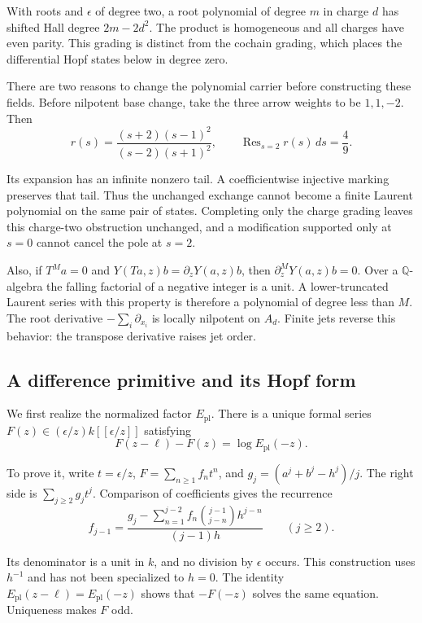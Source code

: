 With roots and $\epsilon$ of degree two, a root polynomial
of degree $m$ in charge $d$ has shifted Hall degree
$2m-2d^2$. The product is homogeneous and all charges have
even parity. This grading is distinct from the cochain
grading, which places the differential Hopf states below
in degree zero.

There are two reasons to change the polynomial carrier before
constructing these fields. Before nilpotent base change, take
the three arrow weights to be $1,1,-2$. Then
\[
 r(s)=\frac{(s+2)(s-1)^2}{(s-2)(s+1)^2},
 \qquad\operatorname{Res}_{s=2}r(s)\,ds=\frac49 .
\]

Its expansion has an infinite nonzero tail.
A coefficientwise injective marking preserves that tail.
Thus the unchanged exchange cannot become a finite Laurent
polynomial on the same pair of states. Completing only the charge grading leaves this
charge-two obstruction unchanged, and a modification supported
only at $s=0$ cannot cancel the pole at $s=2$.

Also, if $T^Ma=0$ and
$Y(Ta,z)b=\partial_zY(a,z)b$, then
$\partial_z^MY(a,z)b=0$.
Over a $\mathbb Q$-algebra the falling factorial of a
negative integer is a unit.
A lower-truncated Laurent series with this property is
therefore a polynomial of degree less than $M$.
The root derivative $-\sum_i\partial_{x_i}$ is locally
nilpotent on $A_d$. Finite jets reverse this behavior:
the transpose derivative raises jet order.

\subsection{A difference primitive and its Hopf form}

We first realize the normalized factor $E_{\mathrm{pl}}$.
There is a unique formal series
$F(z)\in(\epsilon/z)k[[\epsilon/z]]$ satisfying
\begin{equation}\label{v4-arith:curve:eq:difference-primitive}
 F(z-\ell)-F(z)=\log E_{\mathrm{pl}}(-z).
\end{equation}

To prove it, write $t=\epsilon/z$, $F=\sum_{n\geq1}f_nt^n$,
and
$g_j=(a^j+b^j-h^j)/j$.
The right side is $\sum_{j\geq2}g_jt^j$. Comparison of
coefficients gives the recurrence
\[
 f_{j-1}=
 \frac{g_j-\sum_{n=1}^{j-2}
                f_n\binom{j-1}{j-n}h^{j-n}}
      {(j-1)h}\qquad(j\geq2).
\]

Its denominator is a unit in $k$, and no division by
$\epsilon$ occurs. This construction uses $h^{-1}$ and
has not been specialized to $h=0$.
The identity
$E_{\mathrm{pl}}(z-\ell)=E_{\mathrm{pl}}(-z)$ shows that
$-F(-z)$ solves the same equation. Uniqueness makes $F$ odd.

